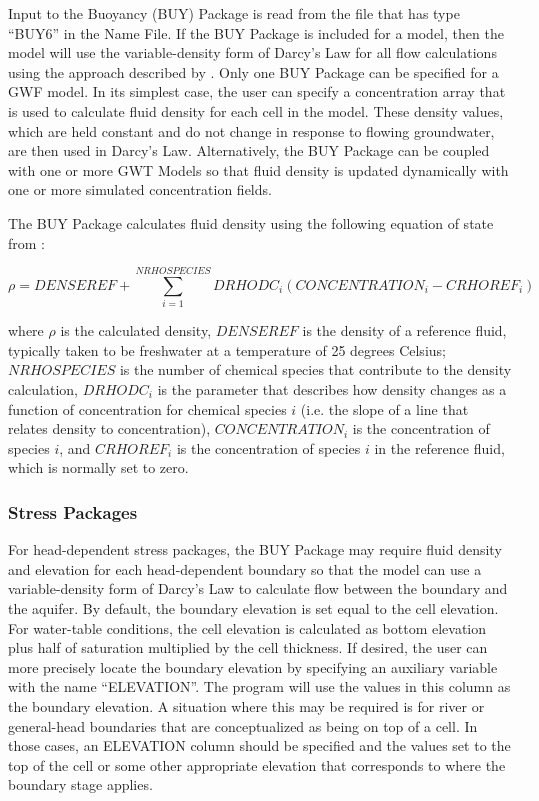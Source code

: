 Input to the Buoyancy (BUY) Package is read from the file that has type ``BUY6'' in the Name File.  If the BUY Package is included for a model, then the model will use the variable-density form of Darcy's Law for all flow calculations using the approach described by \cite{langevin2020}.  Only one BUY Package can be specified for a GWF model.  In its simplest case, the user can specify a concentration array that is used to calculate fluid density for each cell in the model.  These density values, which are held constant and do not change in response to flowing groundwater, are then used in Darcy's Law.  Alternatively, the BUY Package can be coupled with one or more GWT Models so that fluid density is updated dynamically with one or more simulated concentration fields.

The BUY Package calculates fluid density using the following equation of state from \cite{langevin2008seawat}:

\begin{equation}
\label{eqn:volumeconservationdiscrete}
\rho = DENSEREF + \sum_{i=1}^{NRHOSPECIES} DRHODC_i \left ( CONCENTRATION_i - CRHOREF_i \right )
\end{equation}

\noindent where $\rho$ is the calculated density, $DENSEREF$ is the density of a reference fluid, typically taken to be freshwater at a temperature of 25 degrees Celsius; $NRHOSPECIES$ is the number of chemical species that contribute to the density calculation, $DRHODC_i$ is the parameter that describes how density changes as a function of concentration for chemical species $i$ (i.e. the slope of a line that relates density to concentration), $CONCENTRATION_i$ is the concentration of species $i$, and $CRHOREF_i$ is the concentration of species $i$ in the reference fluid, which is normally set to zero.

\subsubsection{Stress Packages}
For head-dependent stress packages, the BUY Package may require fluid density and elevation for each head-dependent boundary so that the model can use a variable-density form of Darcy's Law to calculate flow between the boundary and the aquifer.  By default, the boundary elevation is set equal to the cell elevation.  For water-table conditions, the cell elevation is calculated as bottom elevation plus half of saturation multiplied by the cell thickness.  If desired, the user can more precisely locate the boundary elevation by specifying an auxiliary variable with the name ``ELEVATION''.  The program will use the values in this column as the boundary elevation.  A situation where this may be required is for river or general-head boundaries that are conceptualized as being on top of a cell.  In those cases, an ELEVATION column should be specified and the values set to the top of the cell or some other appropriate elevation that corresponds to where the boundary stage applies.

